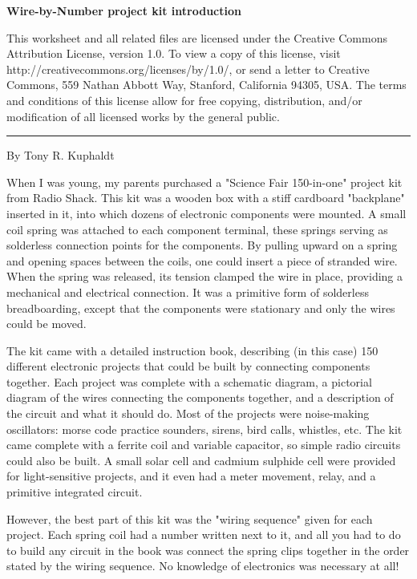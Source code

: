 
\centerline{\bf Wire-by-Number project kit introduction} \bigskip 
 
This worksheet and all related files are licensed under the Creative Commons Attribution License, version 1.0.  To view a copy of this license, visit http://creativecommons.org/licenses/by/1.0/, or send a letter to Creative Commons, 559 Nathan Abbott Way, Stanford, California 94305, USA.  The terms and conditions of this license allow for free copying, distribution, and/or modification of all licensed works by the general public.

\bigskip 

\hrule

\vskip 10pt

\noindent By Tony R. Kuphaldt

\vskip 10pt

When I was young, my parents purchased a "Science Fair 150-in-one" project kit from Radio Shack.  This kit was a wooden box with a stiff cardboard "backplane" inserted in it, into which dozens of electronic components were mounted.  A small coil spring was attached to each component terminal, these springs serving as solderless connection points for the components.  By pulling upward on a spring and opening spaces between the coils, one could insert a piece of stranded wire.  When the spring was released, its tension clamped the wire in place, providing a mechanical and electrical connection.  It was a primitive form of solderless breadboarding, except that the components were stationary and only the wires could be moved.

The kit came with a detailed instruction book, describing (in this case) 150 different electronic projects that could be built by connecting components together.  Each project was complete with a schematic diagram, a pictorial diagram of the wires connecting the components together, and a description of the circuit and what it should do.  Most of the projects were noise-making oscillators: morse code practice sounders, sirens, bird calls, whistles, etc.  The kit came complete with a ferrite coil and variable capacitor, so simple radio circuits could also be built.  A small solar cell and cadmium sulphide cell were provided for light-sensitive projects, and it even had a meter movement, relay, and a primitive integrated circuit.

However, the best part of this kit was the "wiring sequence" given for each project.  Each spring coil had a number written next to it, and all you had to do to build any circuit in the book was connect the spring clips together in the order stated by the wiring sequence.  No knowledge of electronics was necessary at all!

